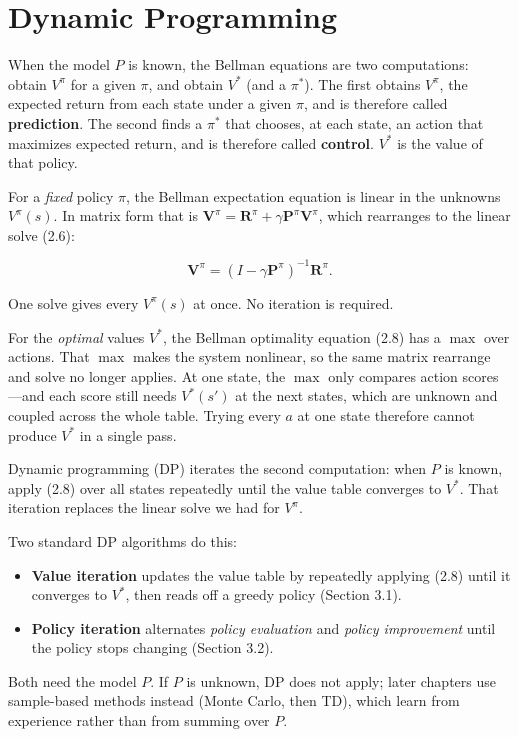 \chapter{Dynamic Programming}

When the model $P$ is known, the Bellman equations are two computations: obtain $V^\pi$ for a given $\pi$, and obtain $V^*$ (and a $\pi^*$). The first obtains $V^\pi$, the expected return from each state under a given $\pi$, and is therefore called \textbf{prediction}. The second finds a $\pi^*$ that chooses, at each state, an action that maximizes expected return, and is therefore called \textbf{control}. $V^*$ is the value of that policy.

For a \textit{fixed} policy $\pi$, the Bellman expectation equation is linear in the unknowns $V^\pi(s)$. In matrix form that is $\mathbf{V}^\pi=\mathbf{R}^\pi+\gamma\mathbf{P}^\pi\mathbf{V}^\pi$, which rearranges to the linear solve (2.6):

\[
\mathbf{V}^\pi=(I-\gamma\mathbf{P}^\pi)^{-1}\mathbf{R}^\pi.
\]

One solve gives every $V^\pi(s)$ at once. No iteration is required.

For the \textit{optimal} values $V^*$, the Bellman optimality equation (2.8) has a $\max$ over actions. That $\max$ makes the system nonlinear, so the same matrix rearrange and solve no longer applies. At one state, the $\max$ only compares action scores---and each score still needs $V^*(s')$ at the next states, which are unknown and coupled across the whole table. Trying every $a$ at one state therefore cannot produce $V^*$ in a single pass.

Dynamic programming (DP) iterates the second computation: when $P$ is known, apply (2.8) over all states repeatedly until the value table converges to $V^*$. That iteration replaces the linear solve we had for $V^\pi$.

Two standard DP algorithms do this:

\begin{itemize}
\item \textbf{Value iteration} updates the value table by repeatedly applying (2.8) until it converges to $V^*$, then reads off a greedy policy (Section 3.1).
\item \textbf{Policy iteration} alternates \textit{policy evaluation} and \textit{policy improvement} until the policy stops changing (Section 3.2).
\end{itemize}
Both need the model $P$. If $P$ is unknown, DP does not apply; later chapters use sample-based methods instead (Monte Carlo, then TD), which learn from experience rather than from summing over $P$.

